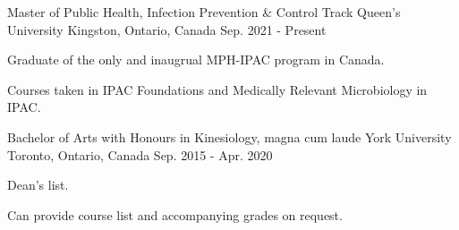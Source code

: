 

\begin{cventries}

  \cventry
    {Master of Public Health, Infection Prevention \& Control Track} %
    {Queen's University} %
    {Kingston, Ontario, Canada} %
    {Sep. 2021 - Present} %
    {
      \begin{cvitems} %
        \item {Graduate of the only and inaugrual MPH-IPAC program in Canada.}
        \item {Courses taken in IPAC Foundations and Medically Relevant Microbiology in IPAC.}
      \end{cvitems}
    }

  \cventry
    {Bachelor of Arts with Honours in Kinesiology, magna cum laude} %
    {York University} %
    {Toronto, Ontario, Canada} %
    {Sep. 2015 - Apr. 2020} %
    {
      \begin{cvitems} %
        \item {Dean's list.}
        \item {Can provide course list and accompanying grades on request.}
      \end{cvitems}
    }

\end{cventries}

